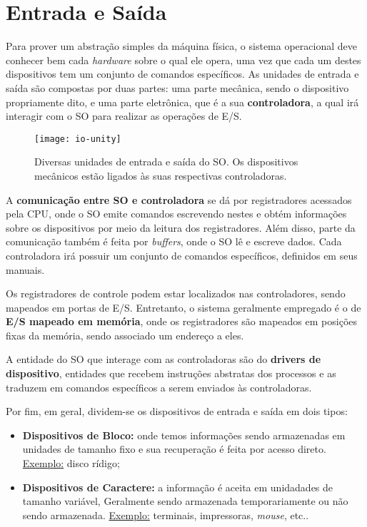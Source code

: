 \chapter{Entrada e Saída}

Para prover um abstração simples da máquina física, o sistema operacional deve conhecer bem cada \textit{hardware} sobre o qual ele opera, uma vez que cada um destes dispositivos tem um conjunto de comandos específicos. As unidades de entrada e saída são compostas por duas partes: uma parte mecânica, sendo o dispositivo propriamente dito, e uma parte eletrônica, que é a sua \textbf{controladora}, a qual irá interagir com o SO para realizar as operações de E/S.

\begin{figure}[H]
  \centering
  \texttt{[image: io-unity]}
  \caption{Diversas unidades de entrada e saída do SO. Os dispositivos mecânicos estão ligados às suas respectivas controladoras.}
  \label{fig:io-unity}
\end{figure}

A \textbf{comunicação entre SO e controladora} se dá por registradores acessados pela CPU, onde o SO emite comandos escrevendo nestes e obtém informações sobre os dispositivos por meio da leitura dos registradores. Além disso, parte da comunicação também é feita por \textit{buffers}, onde o SO lê e escreve dados. Cada controladora irá possuir um conjunto de comandos específicos, definidos em seus manuais.

Os registradores de controle podem estar localizados nas controladores, sendo mapeados em portas de E/S. Entretanto, o sistema geralmente empregado é o de \textbf{E/S mapeado em memória}, onde os registradores são mapeados em posições fixas da memória, sendo associado um endereço a eles.

A entidade do SO que interage com as controladoras são do \textbf{drivers de dispositivo}, entidades que recebem instruções abstratas dos processos e as traduzem em comandos específicos a serem enviados às controladoras.

Por fim, em geral, dividem-se os dispositivos de entrada e saída em dois tipos:
\begin{itemize}
  \item \textbf{Dispositivos de Bloco:} onde temos informações sendo armazenadas em unidades de tamanho fixo e sua recuperação é feita por acesso direto. \underline{Exemplo:} disco rídigo;

  \item \textbf{Dispositivos de Caractere:} a informação é aceita em unidadades de tamanho variável, Geralmente sendo armazenada temporariamente ou não sendo armazenada. \underline{Exemplo:} terminais, impressoras, \textit{mouse}, etc..
\end{itemize}





